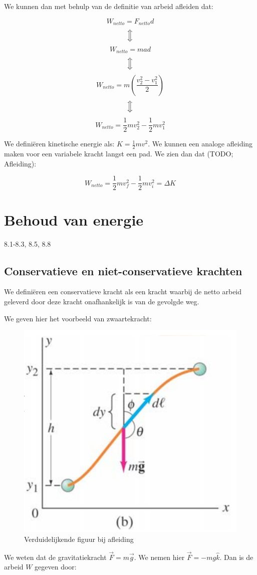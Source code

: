 \documentclass[12pt,a4paper]{article}
\newcommand{\Luda}{\Big\Updownarrow}
\begin{document}
    We kunnen dan met behulp van de definitie van arbeid afleiden dat:
    
    $$W_{netto} = F_{netto}d$$
    $$\Luda$$
    $$W_{netto} = mad$$
    $$\Luda$$
    $$W_{netto} = m\left( \frac{v_{2}^{2} - v_{1}^{2}}{2} \right)$$
    $$\Luda$$
    $$W_{netto} = \frac{1}{2} mv_{2}^{2} - \frac{1}{2} mv_{1}^{2} $$
    
    We definiëren kinetische energie als: $K = \frac{1}{2}mv^{2}$. We kunnen een analoge afleiding maken voor
    een variabele kracht langst een pad. We zien dan dat (TODO; Afleiding):
    
    $$W_{netto} = \frac{1}{2}mv_{f}^{2} - \frac{1}{2}mv_{i}^{2} = \Delta K$$
    
    \section{Behoud van energie}
    8.1-8.3, 8.5, 8.8
    
    \subsection{Conservatieve en niet-conservatieve krachten}
    We definiëren een conservatieve kracht als een kracht waarbij de netto arbeid geleverd door deze kracht
    onafhankelijk is van de gevolgde weg. 
    
    We geven hier het voorbeeld van zwaartekracht:
    
    \begin{figure}[h]
    	\centering
	\includegraphics[width=0.6\linewidth]{zwaartekracht_conservatief}
    	\caption{Verduidelijkende figuur bij afleiding}
        	\label{zwaartekracht_conservatief}
    \end{figure}

    We weten dat de gravitatiekracht $\vec{F} = m\vec{g}$. We nemen hier $\vec{F} = -mg\hat{k}$. 
    Dan is de arbeid $W$ gegeven door:
    
\end{document}
